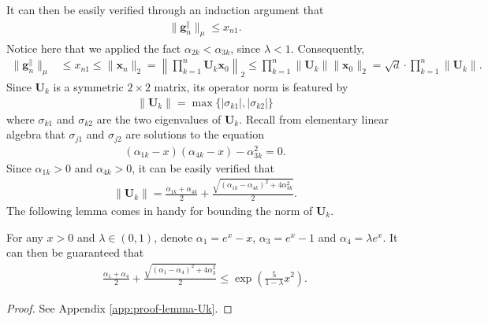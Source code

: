 It can then be easily verified through an induction argument that 
\begin{align*}
\|\bm{g}_n^{\parallel}\|_{\mu} \leq x_{n1}.
\end{align*}
Notice here that we applied the fact $\alpha_{2k}< \alpha_{3k}$, since $\lambda < 1$. Consequently, 
\begin{align*}
\|\bm{g}_n^{\parallel}\|_{\mu} &\leq x_{n1} 
\leq \|\bm{x}_n\|_2 
= \left\|\prod_{k=1}^n \bm{U}_k \bm{x}_0\right\|_2 
 \leq \prod_{k=1}^n \|\bm{U}_k\| \|\bm{x}_0\|_2 =  \sqrt{d} \cdot \prod_{k=1}^n \|\bm{U}_k\|.
\end{align*}
Since $\bm{U}_k$ is a symmetric $2 \times 2$ matrix, its operator norm is featured by
\begin{align*}
\|\bm{U}_k\| = \max\{|\sigma_{k1}|,|\sigma_{k2}|\}
\end{align*}
where $\sigma_{k1}$ and $\sigma_{k2}$ are the two eigenvalues of $\bm{U}_k$. Recall from elementary linear algebra that $\sigma_{j1}$ and $\sigma_{j2}$ are solutions to the equation
\begin{align*}
(\alpha_{1k} - x)(\alpha_{4k}-x) -\alpha_{3k}^2 = 0.
\end{align*}
Since $\alpha_{1k} > 0$ and $\alpha_{4k} > 0$, it can be easily verified that
\begin{align*}
\|\bm{U}_k\| = \frac{\alpha_{1k} + \alpha_{4k}}{2} + \frac{\sqrt{(\alpha_{1k} - \alpha_{4k})^2 + 4\alpha_{3k}^2}}{2}.
\end{align*}
The following lemma comes in handy for bounding the norm of $\bm{U}_k$.
\begin{customlemma}\label{lemma:Uk}
For any $x>0$ and $\lambda \in (0,1)$, denote $\alpha_1 = e^x - x$, $\alpha_3 = e^x - 1$ and $\alpha_4 = \lambda e^x$. It can then be guaranteed that
\begin{align*}
\frac{\alpha_1 + \alpha_4}{2} + \frac{\sqrt{(\alpha_1 - \alpha_4)^2 + 4\alpha_3^2}}{2} \leq \exp\left(\frac{5}{1-\lambda}x^2\right).
\end{align*}
\end{customlemma}  
\begin{proof} 
See Appendix \ref{app:proof-lemma-Uk}.
\end{proof}

